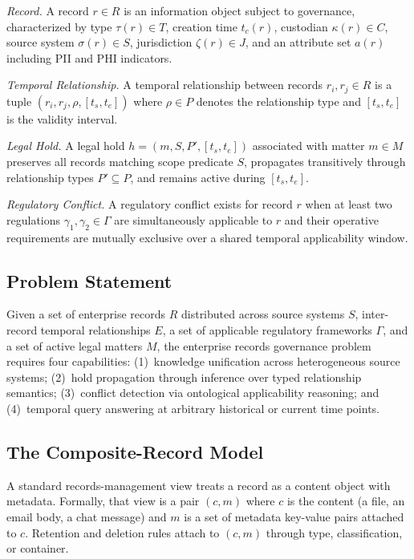 \documentclass{ieeeaccess}
\begin{document}
\textit{Record.} A record $r \in R$ is an information object subject to governance, characterized by type $\tau(r) \in T$, creation time $t_c(r)$, custodian $\kappa(r) \in C$, source system $\sigma(r) \in S$, jurisdiction $\zeta(r) \in J$, and an attribute set $a(r)$ including PII and PHI indicators.

\textit{Temporal Relationship.} A temporal relationship between records $r_i, r_j \in R$ is a tuple $(r_i, r_j, \rho, [t_s, t_e])$ where $\rho \in P$ denotes the relationship type and $[t_s, t_e]$ is the validity interval.

\textit{Legal Hold.} A legal hold $h = (m, S, P', [t_s, t_e])$ associated with matter $m \in M$ preserves all records matching scope predicate $S$, propagates transitively through relationship types $P' \subseteq P$, and remains active during $[t_s, t_e]$.

\textit{Regulatory Conflict.} A regulatory conflict exists for record $r$ when at least two regulations $\gamma_1, \gamma_2 \in \Gamma$ are simultaneously applicable to $r$ and their operative requirements are mutually exclusive over a shared temporal applicability window.

\subsection{Problem Statement}

Given a set of enterprise records $R$ distributed across source systems $S$, inter-record temporal relationships $E$, a set of applicable regulatory frameworks $\Gamma$, and a set of active legal matters $M$, the enterprise records governance problem requires four capabilities: (1)~knowledge unification across heterogeneous source systems; (2)~hold propagation through inference over typed relationship semantics; (3)~conflict detection via ontological applicability reasoning; and (4)~temporal query answering at arbitrary historical or current time points.

\subsection{The Composite-Record Model}
\label{sec:composite}

A standard records-management view treats a record as a content object with metadata. Formally, that view is a pair $(c, m)$ where $c$ is the content (a file, an email body, a chat message) and $m$ is a set of metadata key-value pairs attached to $c$. Retention and deletion rules attach to $(c, m)$ through type, classification, or container.
\end{document}
